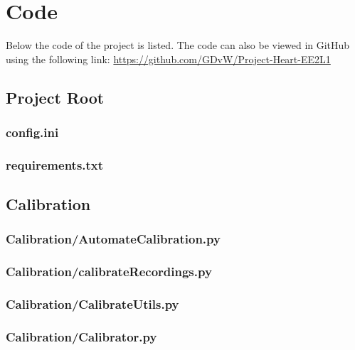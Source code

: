 \chapter{Code}
Below the code of the project is listed. The code can also be viewed in GitHub using the following link: \url{https://github.com/GDvW/Project-Heart-EE2L1}
\section{Project Root}

\subsection*{config.ini}
\label{ap:config}

\subsection*{requirements.txt}
\label{ap:requirements}
\section{Calibration}

\subsection*{Calibration/AutomateCalibration.py}
\label{ap:AutomateCalibration}

\subsection*{Calibration/calibrateRecordings.py}
\label{ap:calibrateRecordings}

\subsection*{Calibration/CalibrateUtils.py}
\label{ap:CalibrateUtils}

\subsection*{Calibration/Calibrator.py}
\label{ap:Calibrator}
